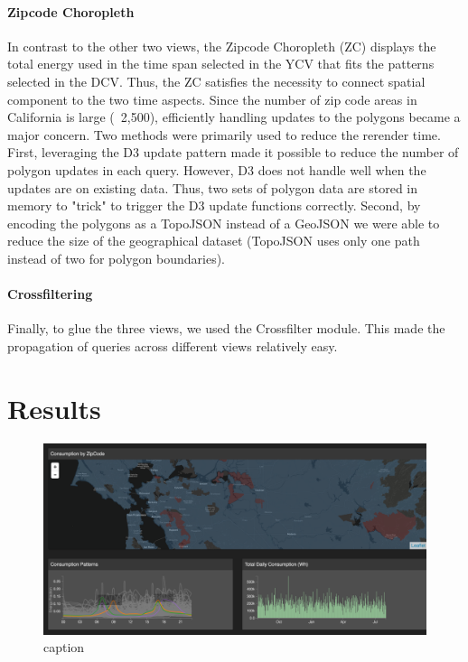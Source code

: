 \documentclass[letterpaper, 12 pt, conference]{ieeeconf}  %
\begin{document}
\paragraph{Zipcode Choropleth} In contrast to the other two views, the Zipcode Choropleth (ZC) displays the total energy used in the time span selected in the YCV that fits the patterns selected in the DCV. Thus, the ZC satisfies the necessity to connect spatial component to the two time aspects. Since the number of zip code areas in California is large (~2,500), efficiently handling updates to the polygons became a major concern. Two methods were primarily used to reduce the rerender time. First, leveraging the D3 update pattern made it possible to reduce the number of polygon updates in each query. However, D3 does not handle well when the updates are on existing data. Thus, two sets of polygon data are stored in memory to "trick" to trigger the D3 update functions correctly. Second, by encoding the polygons as a TopoJSON instead of a GeoJSON we were able to reduce the size of the geographical dataset (TopoJSON uses only one path instead of two for polygon boundaries).

\paragraph{Crossfiltering} Finally, to glue the three views, we used the Crossfilter \cite{crossfilter} module. This made the propagation of queries across different views relatively easy.

\section{Results}

\begin{figure}[tb]
\centering
\includegraphics[width=\textwidth]{screenshot.png}
\caption{caption}
\label{fig:viz}
\end{figure}
\end{document}
